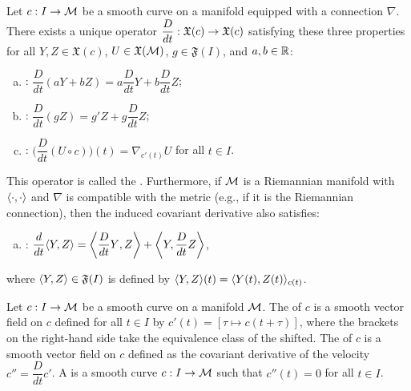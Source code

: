 \documentclass[11pt,a4paper]{article}
\begin{document}
\begin{prop}
Let $c:I\rightarrow \mathcal{M}$ be a smooth curve on a manifold equipped with a connection $\nabla$. There exists a unique operator $\dfrac{D}{dt}:\mathfrak{X}(c)\rightarrow \mathfrak{X}(c)$ satisfying these three properties for all $Y,Z\in\mathfrak{X}(c)$, $U\in\mathfrak{X}(\mathcal{M})$, $g\in \mathfrak{F}(I)$, and $a,b\in\mathbb{R}$:
\begin{enumerate}[(a)]
    \item {}: $\dfrac{D}{dt}(aY+bZ) = a\dfrac{D}{dt}Y+b\dfrac{D}{dt}Z$;
    \item {}: $\dfrac{D}{dt}(gZ) = g'Z + g\dfrac{D}{dt}Z$;
    \item {}: $\bigg( \dfrac{D}{dt}(U\circ c) \bigg)(t) = \nabla_{c'(t)} U$ for all $t\in I$.
\end{enumerate}
This operator is called the . Furthermore, if $\mathcal{M}$ is a Riemannian manifold with $\langle \cdot, \cdot \rangle$ and $\nabla$ is compatible with the metric (e.g., if it is the Riemannian connection), then the induced covariant derivative also satisfies:
\begin{enumerate}[(d)]
    \item {}: $\dfrac{d}{dt}\langle Y, Z \rangle = \bigg\langle{\dfrac{D}{dt}Y},{Z}\bigg\rangle+\bigg\langle{Y},{\dfrac{D}{dt}}Z\bigg\rangle$,
\end{enumerate}
where $\langle Y, Z \rangle\in\mathfrak{F}(I)$ is defined by $\langle Y, Z \rangle(t) = \langle Y(t), Z(t) \rangle_{c(t)}$.
\end{prop}

\begin{mydef}
Let $c:I\rightarrow \mathcal{M}$ be a smooth curve on a manifold $\mathcal{M}$. The  of $c$ is a smooth vector field on $c$ defined for all $t\in I$ by $c'(t) = [\tau \mapsto c(t+\tau)]$,
where the brackets on the right-hand side take the equivalence class of the shifted. The  of $c$ is a smooth vector field on $c$ defined as the covariant derivative of the velocity $c'' = \dfrac{D}{dt}c'$. A  is a smooth curve $c:I\rightarrow \mathcal{M}$ such that $c''(t) = 0$ for all $t\in I$.
\end{mydef}
\end{document}
